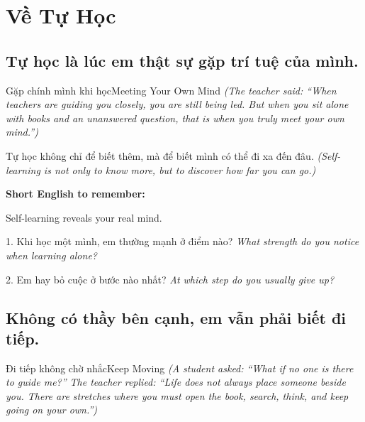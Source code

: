 \chapter{Về Tự Học}

\section{Tự học là lúc em thật sự gặp trí tuệ của mình.}
\begin{truyen}{Gặp chính mình khi học}{Meeting Your Own Mind}
\textit{(The teacher said: ``When teachers are guiding you closely, you are still being led. But when you sit alone with books and an unanswered question, that is when you truly meet your own mind.'')}
\end{truyen}

\begin{baihoc}
Tự học không chỉ để biết thêm, mà để biết mình có thể đi xa đến đâu.
\textit{(Self-learning is not only to know more, but to discover how far you can go.)}
\end{baihoc}

\begin{ghinhoanh}
\textbf{Short English to remember:}

Self-learning reveals your real mind.

\end{ghinhoanh}

\begin{tuhocnhanh}
1. Khi học một mình, em thường mạnh ở điểm nào? \textit{What strength do you notice when learning alone?}

2. Em hay bỏ cuộc ở bước nào nhất? \textit{At which step do you usually give up?}
\end{tuhocnhanh}
\ngancach

\section{Không có thầy bên cạnh, em vẫn phải biết đi tiếp.}
\begin{truyen}{Đi tiếp không chờ nhắc}{Keep Moving}
\textit{(A student asked: ``What if no one is there to guide me?'' The teacher replied: ``Life does not always place someone beside you. There are stretches where you must open the book, search, think, and keep going on your own.'')}
\end{truyen}

